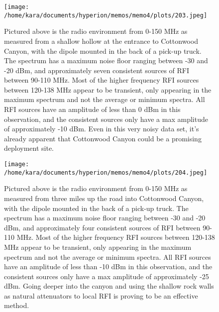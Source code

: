 \documentclass[11pt]{article}
\begin{document}
\begin{figure}[H]
    \begin{center}
    \texttt{[image: /home/kara/documents/hyperion/memos/memo4/plots/203.jpeg]}
    \end{center}
    \caption{
        Pictured above is the radio environment from 0-150 MHz as measured from 
        a shallow hollow at the entrance to Cottonwood Canyon, with the dipole 
        mounted in the back of a pick-up truck.  The spectrum has a maximum 
        noise floor ranging between -30 and -20 dBm, and approximately seven 
        consistent sources of RFI between 90-110 MHz. Most of the higher 
        frequency RFI sources between 120-138 MHz appear to be transient, only 
        appearing in the maximum spectrum and not the average or minimum 
        spectra. All RFI sources have an amplitude of less than 0 dBm in this 
        observation, and the consistent sources only have a max amplitude of 
        approximately -10 dBm. Even in this very noisy data set, it's already 
        apparent that Cottonwood Canyon could be a promising deployment site.
    }
    \label{fig:203}
\end{figure}
\begin{figure}[H]
    \begin{center}
    \texttt{[image: /home/kara/documents/hyperion/memos/memo4/plots/204.jpeg]}
    \end{center}
    \caption{
        Pictured above is the radio environment from 0-150 MHz as measured from 
        three miles up the road into Cottonwood Canyon, with the dipole mounted 
        in the back of a pick-up truck.  The spectrum has a maximum noise floor 
        ranging between -30 and -20 dBm, and approximately four consistent 
        sources of RFI between 90-110 MHz. Most of the higher frequency RFI 
        sources between 120-138 MHz appear to be transient, only appearing in 
        the maximum spectrum and not the average or minimum spectra. All RFI 
        sources have an amplitude of less than -10 dBm in this observation, and 
        the consistent sources only have a max amplitude of approximately -25 
        dBm. Going deeper into the canyon and using the shallow rock walls as 
        natural attenuators to local RFI is proving to be an effective method.
    }
    \label{fig:204}
\end{figure}
\end{document}
